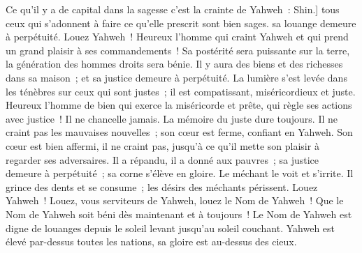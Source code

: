 \begin{multicols}{2}
 Ce qu'il y a de capital dans la sagesse c'est la crainte de Yahweh~: Shin.] tous ceux qui s'adonnent à faire ce qu'elle prescrit sont bien sages.  sa louange demeure à perpétuité.
\VerseOne{}Louez Yahweh~!  Heureux l'homme qui craint Yahweh  et qui prend un grand plaisir à ses commandements~!
 Sa postérité sera puissante sur la terre,  la génération des hommes droits sera bénie.
 Il y aura des biens et des richesses dans sa maison~;  et sa justice demeure à perpétuité.
 La lumière s'est levée dans les ténèbres sur ceux qui sont justes~;  il est compatissant, miséricordieux et juste.
 Heureux l'homme de bien qui exerce la miséricorde et prête,  qui règle ses actions avec justice~!
 Il ne chancelle jamais.  La mémoire du juste dure toujours.
 Il ne craint pas les mauvaises nouvelles~;  son cœur est ferme, confiant en Yahweh.
 Son cœur est bien affermi, il ne craint pas,  jusqu'à ce qu'il mette son plaisir à regarder ses adversaires.
 Il a répandu, il a donné aux pauvres~;  sa justice demeure à perpétuité~;  sa corne s'élève en gloire.
 Le méchant le voit et s'irrite.  Il grince des dents et se consume~;  les désirs des méchants périssent.
\VerseOne{}Louez Yahweh~! Louez, vous serviteurs de Yahweh, louez le Nom de Yahweh~!
Que le Nom de Yahweh soit béni dès maintenant et à toujours~!
Le Nom de Yahweh est digne de louanges depuis le soleil levant jusqu'au soleil couchant.
Yahweh est élevé par-dessus toutes les nations, sa gloire est au-dessus des cieux.

\end{multicols}
